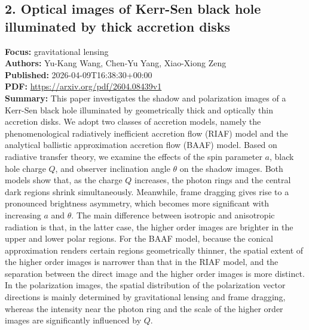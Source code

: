 \documentclass[11pt]{article}
\begin{document}
\subsection*{2. Optical images of Kerr-Sen black hole illuminated by thick accretion disks}
\textbf{Focus:} gravitational lensing\\
\textbf{Authors:} Yu-Kang Wang, Chen-Yu Yang, Xiao-Xiong Zeng\\
\textbf{Published:} 2026-04-09T16:38:30+00:00\\
\textbf{PDF:} \href{https://arxiv.org/pdf/2604.08439v1}{https://arxiv.org/pdf/2604.08439v1}\\
\textbf{Summary:}
This paper investigates the shadow and polarization images of a Kerr-Sen black hole illuminated by geometrically thick and optically thin accretion disks. We adopt two classes of accretion models, namely the phenomenological radiatively inefficient accretion flow (RIAF) model and the analytical ballistic approximation accretion flow (BAAF) model. Based on radiative transfer theory, we examine the effects of the spin parameter $a$, black hole charge $Q$, and observer inclination angle $θ$ on the shadow images. Both models show that, as the charge $Q$ increases, the photon rings and the central dark regions shrink simultaneously. Meanwhile, frame dragging gives rise to a pronounced brightness asymmetry, which becomes more significant with increasing $a$ and $θ$. The main difference between isotropic and anisotropic radiation is that, in the latter case, the higher order images are brighter in the upper and lower polar regions. For the BAAF model, because the conical approximation renders certain regions geometrically thinner, the spatial extent of the higher order images is narrower than that in the RIAF model, and the separation between the direct image and the higher order images is more distinct. In the polarization images, the spatial distribution of the polarization vector directions is mainly determined by gravitational lensing and frame dragging, whereas the intensity near the photon ring and the scale of the higher order images are significantly influenced by $Q$.
\newpage
\end{document}
